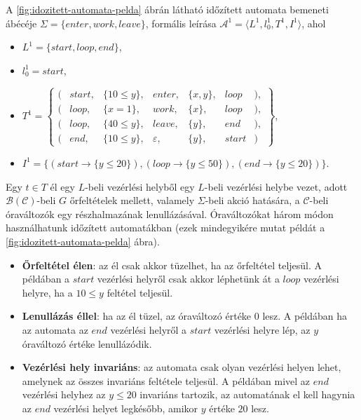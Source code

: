 \begin{example}
A \ref{fig:idozitett-automata-pelda} ábrán látható időzített automata bemeneti ábécéje $\Sigma = \{enter, work, leave\}$, formális leírása $\mathcal{A}^1 = \langle L^1,l_0^1,T^1,I^1 \rangle$, ahol
\begin{itemize}
    \item $L^1 = \{start, loop, end\}$,
    \item $l_0^1 = start$,
    \item $T^1 = 
    \begin{Bmatrix}
    (&start,& \{10 \leq y\},& enter,& \{x, y\},& loop&),\\
    (&loop,& \{x = 1\},& work,& \{x\},& loop&),\\
    (&loop,& \{40 \leq y\},& leave,& \{y\},& end&),\\
    (&end,& \{10 \leq y\},& \varepsilon,& \{y\},& start&)
    \end{Bmatrix}$,
    \item $I^1 = \{ (start \rightarrow \{ y \leq 20 \}), (loop \rightarrow \{ y \leq 50 \}), (end \rightarrow \{ y \leq 20 \}) \}$.
\end{itemize}
\end{example}

Egy $t \in T$ él egy $L$-beli vezérlési helyből egy $L$-beli vezérlési helybe vezet, adott $\mathcal{B}(\mathcal{C})$-beli $G$ őrfeltételek mellett, valamely $\Sigma$-beli akció hatására, a $\mathcal{C}$-beli óraváltozók egy részhalmazának lenullázásával.
Óraváltozókat három módon használhatunk időzített automatákban (ezek mindegyikére mutat példát a \ref{fig:idozitett-automata-pelda} ábra).

\begin{itemize}
    \item 	\textbf{Őrfeltétel élen}: az él csak akkor tüzelhet, ha az őrfeltétel teljesül. A példában a $start$ vezérlési helyről csak akkor léphetünk át a $loop$ vezérlési helyre, ha a $10 \leq y$ feltétel teljesül.
    \item 	\textbf{Lenullázás éllel}: ha az él tüzel, az óraváltozó értéke $0$ lesz. A példában ha az automata az $end$ vezérlési helyről a $start$ vezérlési helyre lép, az $y$ óraváltozó értéke lenullázódik.
    \item 	\textbf{Vezérlési hely invariáns}: az automata csak olyan vezérlési helyen lehet, amelynek az összes invariáns feltétele teljesül. A példában mivel az $end$ vezérlési helyhez az $y \leq 20$ invariáns tartozik, az automatának el kell hagynia az $end$ vezérlési helyet legkésőbb, amikor $y$ értéke $20$ lesz.
\end{itemize}

